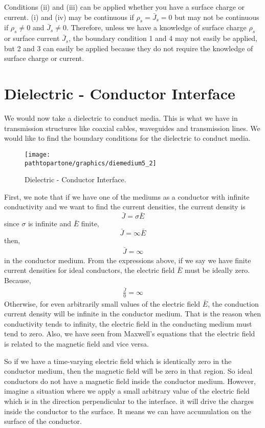 Conditions (ii) and (iii) can be applied whether you have a surface charge or current. (i) and (iv) may be continuous if $\rho_s = \bar{J}_s = 0$ but may not be continuous if $\rho_s\neq 0$ and $\bar{J}_s\neq 0$.
Therefore, unless we have a knowledge of surface charge $\rho_s$ or surface current $\bar{J}_s$, the boundary condition 1 and 4 may not easily be applied, but 2 and 3 can easily be applied because they do not require the knowledge of surface charge or current.

\section{Dielectric - Conductor Interface}
We would now take a dielectric to conduct media. This is what we have in transmission structures like coaxial cables, waveguides and transmission lines. We would like to find the boundary conditions for the dielectric to conduct media. 
\begin{figure}[h]
\centering
\texttt{[image: \\pathtopartone/graphics/diemedium5\_2]}
\caption{Dielectric - Conductor Interface.}
\end{figure}

First, we note that if we have one of the mediums as a  conductor with infinite conductivity and we want to find the current densities, the current density is 
\begin{equation}
\bar{J} = \sigma\bar{E}
\end{equation}
since $\sigma$ is infinite and $\bar{E}$ finite,
\begin{equation*}
\bar{J} = \infty\bar{E}
\end{equation*} 
then,
\begin{align*}
\bar{J} = \infty
\end{align*}
in the conductor medium. From the expressions above, if we say we have finite current densities for ideal conductors, the electric field $\bar{E}$ must be ideally zero. Because,
\begin{align*}
\frac{\bar{J}}{0} = \infty
\end{align*}
Otherwise, for even arbitrarily small values of the electric field $\bar{E}$, the conduction current density will be infinite in the conductor medium. That is the reason when conductivity tends to infinity, the electric field in the conducting medium must tend to zero. Also, we have seen from Maxwell's equations that the electric field is related to the magnetic field and vice versa. 

So if we have a time-varying electric field which is identically zero in the conductor medium, then the magnetic field will be zero in that region. So ideal conductors do not have a magnetic field inside the conductor medium. However, imagine a situation where we apply a small arbitrary value of the electric field which is in the direction perpendicular to the interface. it will drive the charges inside the conductor to the surface. It means we can have accumulation on the surface of the conductor. 

